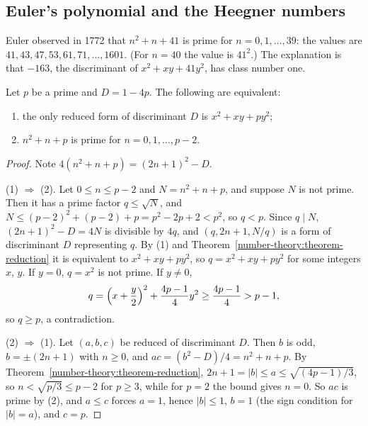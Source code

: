 \subsection{Euler's polynomial and the Heegner numbers}\label{number-theory:subsection-heegner}

Euler observed in 1772 that $n^2 + n + 41$ is prime for $n = 0, 1, \ldots, 39$: the values are $41, 43, 47, 53, 61, 71, \ldots, 1601$. (For $n = 40$ the value is $41^2$.) The explanation is that $-163$,
the discriminant of $x^2 + xy + 41y^2$, has class number one.

\begin{theorem}[Rabinowitsch]\label{number-theory:theorem-rabinowitsch}
Let $p$ be a prime and $D = 1 - 4p$. The following are equivalent:
\begin{enumerate}
\item the only reduced form of discriminant $D$ is $x^2 + xy + py^2$;
\item $n^2 + n + p$ is prime for $n = 0, 1, \ldots, p - 2$.
\end{enumerate}
\end{theorem}

\begin{proof}
Note $4(n^2 + n + p) = (2n + 1)^2 - D$.

(1) $\Rightarrow$ (2). Let $0 \leq n \leq p - 2$ and $N = n^2 + n + p$, and suppose $N$ is not prime. Then it has a prime factor $q \leq \sqrt N$, and $N \leq (p - 2)^2 + (p - 2) + p = p^2 - 2p + 2 < p^2$,
so $q < p$. Since $q \mid N$, $(2n + 1)^2 - D = 4N$ is divisible by $4q$, and $(q, 2n + 1, N/q)$ is a form of discriminant $D$ representing $q$. By (1) and Theorem~\ref{number-theory:theorem-reduction} it
is equivalent to $x^2 + xy + py^2$, so $q = x^2 + xy + py^2$ for some integers $x$, $y$. If $y = 0$, $q = x^2$ is not prime. If $y \neq 0$,
\[
q = \Bigl(x + \frac y2\Bigr)^2 + \frac{4p - 1}{4}y^2 \geq \frac{4p - 1}{4} > p - 1,
\]
so $q \geq p$, a contradiction.

(2) $\Rightarrow$ (1). Let $(a, b, c)$ be reduced of discriminant $D$. Then $b$ is odd, $b = \pm(2n + 1)$ with $n \geq 0$, and $ac = (b^2 - D)/4 = n^2 + n + p$. By Theorem~\ref{number-theory:theorem-reduction},
$2n + 1 = |b| \leq a \leq \sqrt{(4p - 1)/3}$, so $n < \sqrt{p/3} \leq p - 2$ for $p \geq 3$, while for $p = 2$ the bound gives $n = 0$. So $ac$ is prime by (2), and $a \leq c$ forces $a = 1$, hence
$|b| \leq 1$, $b = 1$ (the sign condition for $|b| = a$), and $c = p$.
\end{proof}

